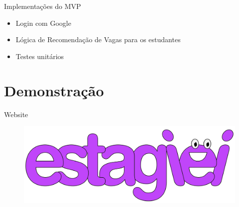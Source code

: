 \documentclass[%
    english,
    brazil]{ifsp-spo-beamer}
\begin{document}
%
%
\begin{frame}{Implementações do MVP}
	\begin{itemize}
		\item Login com Google
		\item Lógica de Recomendação de Vagas para os estudantes
		\item Testes unitários
	\end{itemize}
\end{frame}

%
%
\section{Demonstração}
\begin{frame}{Website} 
	\begin{figure}
		\centering
		\includegraphics[width=\textwidth]{../../imagens/estagiei-logo.png}
	\end{figure}
\end{frame}
\end{document}
